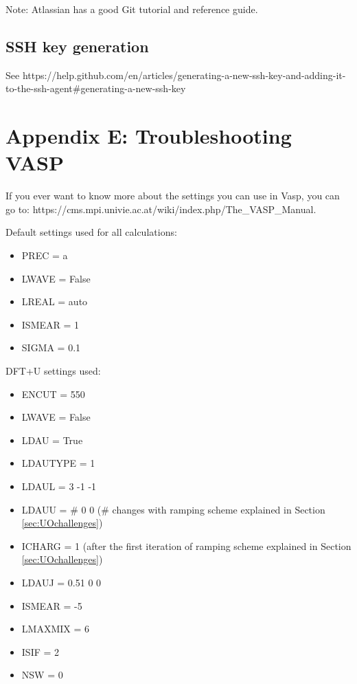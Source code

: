 \documentclass{article}
\begin{document}
Note: Atlassian has a good Git tutorial and reference guide. 

\subsection*{SSH key generation}

See https://help.github.com/en/articles/generating-a-new-ssh-key-and-adding-it-to-the-ssh-agent\#generating-a-new-ssh-key 


\section*{Appendix E: Troubleshooting VASP} \label{sec:VASPsettings} %

If you ever want to know more about the settings you can use in Vasp,
you can go to:
https://cms.mpi.univie.ac.at/wiki/index.php/The\_VASP\_Manual.

\vspace{5mm}
\noindent
Default settings used for all calculations: 
\begin{itemize}
  \item{PREC = a }
  \item{LWAVE = False }
  \item{LREAL = auto }
  \item{ISMEAR = 1 }
  \item{SIGMA = 0.1 }
\end{itemize}

\vspace{5mm}
\noindent
DFT+U settings used:
\begin{itemize}
  \item{ENCUT = 550 }
  \item{LWAVE = False }
  \item{ LDAU = True }
  \item{ LDAUTYPE = 1 }
  \item{ LDAUL = 3 -1 -1 }
  \item{ LDAUU = \# 0 0 (\# changes with ramping scheme explained in
      Section \ref{sec:UOchallenges}) }
  \item{ ICHARG = 1 (after the first iteration of ramping scheme
      explained in Section \ref{sec:UOchallenges}) }
  \item{ LDAUJ = 0.51 0 0 }
  \item{ ISMEAR = -5 }
  \item{ LMAXMIX = 6 }
  \item{ ISIF = 2 }
  \item{ NSW = 0 }
\end{itemize}
\end{document}
